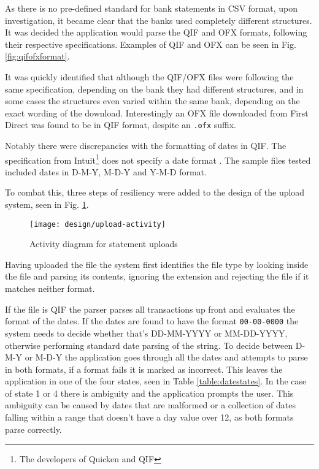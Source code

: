 As there is no pre-defined standard for bank statements in CSV format, upon investigation, it became clear that the banks used completely different structures. It was decided the application would parse the QIF and OFX formats, following their respective specifications. Examples of QIF and OFX can be seen in Fig. \ref{fig:qifofxformat}.

It was quickly identified that although the QIF/OFX files were following the same specification, depending on the bank they had different structures, and in some cases the structures even varied within the same bank, depending on the exact wording of the download. Interestingly an OFX file downloaded from First Direct was found to be in QIF format, despite an \lstinline$.ofx$ suffix.

Notably there were discrepancies with the formatting of dates in QIF. The specification from Intuit\footnote{The developers of Quicken and QIF} does not specify a date format \cite{quiken2010qif}. The sample files tested included dates in D-M-Y, M-D-Y and Y-M-D format.



To combat this, three steps of resiliency were added to the design of the upload system, seen in Fig. \ref{fig:fileupload}.

\begin{figure}[h]
    \centering
    \texttt{[image: design/upload-activity]}
    \caption{Activity diagram for statement uploads}
    \label{fig:fileupload}
    
    \begin{comment}
(start)->(Upload File)->(Identify File Format)-><a>[QIF]->(Identify Date Format)->(Parse Transactions),
<a>[OFX]->(Parse Transactions)->(Remove Duplicates)->(end),
<a>[Other]->(Reject Upload)
    \end{comment}
\end{figure}

Having uploaded the file the system first identifies the file type by looking inside the file and parsing its contents, ignoring the extension and rejecting the file if it matches neither format.

If the file is QIF the parser parses all transactions up front and evaluates the format of the dates. If the dates are found to have the format \lstinline$00-00-0000$ the system needs to decide whether that's DD-MM-YYYY or MM-DD-YYYY, otherwise performing standard date parsing of the string.
%
%
To decide between D-M-Y or M-D-Y the application goes through all the dates and attempts to parse in both formats, if a format fails it is marked as incorrect. This leaves the application in one of the four states, seen in Table \ref{table:datestates}. In the case of state 1 or 4 there is ambiguity and the application prompts the user. This ambiguity can be caused by dates that are malformed or a collection of dates falling within a range that doesn't have a day value over 12, as both formats parse correctly. 

